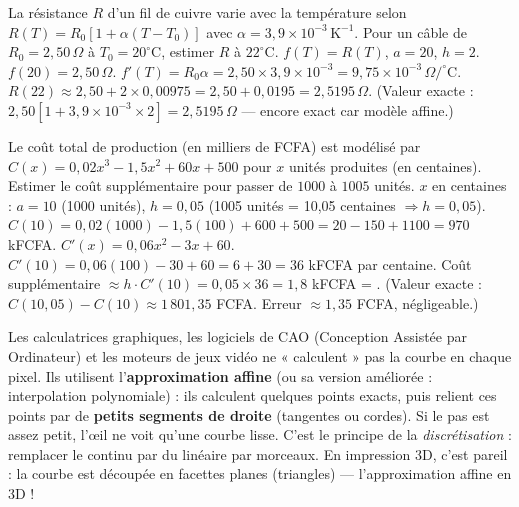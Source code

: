 \documentclass[11pt]{article}
\begin{document}
\begin{exoresolu}
La résistance $R$ d'un fil de cuivre varie avec la température selon $R(T) = R_0[1 + \alpha(T-T_0)]$ avec $\alpha = 3,9\times 10^{-3}\,\text{K}^{-1}$. Pour un câble de $R_0=2,50\,\Omega$ à $T_0=20^\circ\text{C}$, estimer $R$ à $22^\circ\text{C}$.
\tcblower
$f(T)=R(T)$, $a=20$, $h=2$. $f(20)=2,50\,\Omega$. $f'(T)=R_0\alpha = 2,50\times 3,9\times 10^{-3} = 9,75\times 10^{-3}\,\Omega/^\circ\text{C}$.
$R(22) \approx 2,50 + 2\times 0,00975 = 2,50 + 0,0195 = \boxed{2,5195\,\Omega}$.
(Valeur exacte : $2,50[1+3,9\times10^{-3}\times2] = 2,5195\,\Omega$ — encore exact car modèle affine.)
\end{exoresolu}

\begin{exoresolu}
Le coût total de production (en milliers de FCFA) est modélisé par $C(x) = 0,02x^3 - 1,5x^2 + 60x + 500$ pour $x$ unités produites (en centaines). Estimer le coût supplémentaire pour passer de $1000$ à $1005$ unités.
\tcblower
$x$ en centaines : $a=10$ (1000 unités), $h=0,05$ (1005 unités = 10,05 centaines $\Rightarrow h=0,05$).
$C(10) = 0,02(1000) - 1,5(100) + 600 + 500 = 20 - 150 + 1100 = 970$ kFCFA.
$C'(x) = 0,06x^2 - 3x + 60$. $C'(10) = 0,06(100) - 30 + 60 = 6 + 30 = 36$ kFCFA par centaine.
Coût supplémentaire $\approx h \cdot C'(10) = 0,05 \times 36 = 1,8$ kFCFA = .
(Valeur exacte : $C(10,05)-C(10) \approx 1\,801,35$ FCFA. Erreur $\approx 1,35$ FCFA, négligeable.)
\end{exoresolu}

\begin{savaistu}
Les calculatrices graphiques, les logiciels de CAO (Conception Assistée par Ordinateur) et les moteurs de jeux vidéo ne « calculent » pas la courbe en chaque pixel. Ils utilisent l'\textbf{approximation affine} (ou sa version améliorée : interpolation polynomiale) : ils calculent quelques points exacts, puis relient ces points par de \textbf{petits segments de droite} (tangentes ou cordes). Si le pas est assez petit, l'œil ne voit qu'une courbe lisse. C'est le principe de la \emph{discrétisation} : remplacer le continu par du linéaire par morceaux. En impression 3D, c'est pareil : la courbe est découpée en facettes planes (triangles) — l'approximation affine en 3D !
\end{savaistu}
\end{document}
